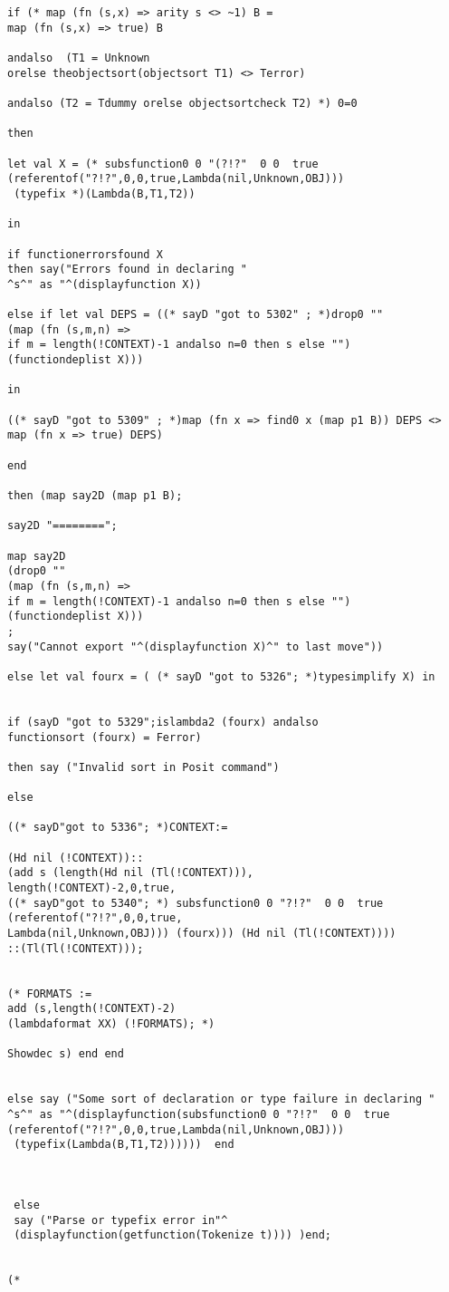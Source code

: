 \documentclass[12pt]{article}
\begin{document}
\begin{verbatim}
if (* map (fn (s,x) => arity s <> ~1) B = 
map (fn (s,x) => true) B

andalso  (T1 = Unknown 
orelse theobjectsort(objectsort T1) <> Terror)

andalso (T2 = Tdummy orelse objectsortcheck T2) *) 0=0

then 

let val X = (* subsfunction0 0 "(?!?"  0 0  true 
(referentof("?!?",0,0,true,Lambda(nil,Unknown,OBJ)))
 (typefix *)(Lambda(B,T1,T2))

in

if functionerrorsfound X 
then say("Errors found in declaring "
^s^" as "^(displayfunction X))

else if let val DEPS = ((* sayD "got to 5302" ; *)drop0 "" 
(map (fn (s,m,n) => 
if m = length(!CONTEXT)-1 andalso n=0 then s else "") 
(functiondeplist X)))

in

((* sayD "got to 5309" ; *)map (fn x => find0 x (map p1 B)) DEPS <>
map (fn x => true) DEPS)

end

then (map say2D (map p1 B);

say2D "========";

map say2D
(drop0 "" 
(map (fn (s,m,n) => 
if m = length(!CONTEXT)-1 andalso n=0 then s else "") 
(functiondeplist X)))
;
say("Cannot export "^(displayfunction X)^" to last move"))

else let val fourx = ( (* sayD "got to 5326"; *)typesimplify X) in


if (sayD "got to 5329";islambda2 (fourx) andalso 
functionsort (fourx) = Ferror)

then say ("Invalid sort in Posit command")

else

((* sayD"got to 5336"; *)CONTEXT:=

(Hd nil (!CONTEXT))::
(add s (length(Hd nil (Tl(!CONTEXT))),
length(!CONTEXT)-2,0,true,
((* sayD"got to 5340"; *) subsfunction0 0 "?!?"  0 0  true 
(referentof("?!?",0,0,true,
Lambda(nil,Unknown,OBJ))) (fourx))) (Hd nil (Tl(!CONTEXT))))
::(Tl(Tl(!CONTEXT)));


(* FORMATS := 
add (s,length(!CONTEXT)-2) 
(lambdaformat XX) (!FORMATS); *)

Showdec s) end end


else say ("Some sort of declaration or type failure in declaring "
^s^" as "^(displayfunction(subsfunction0 0 "?!?"  0 0  true 
(referentof("?!?",0,0,true,Lambda(nil,Unknown,OBJ)))
 (typefix(Lambda(B,T1,T2))))))  end 
 
 
 
 else 
 say ("Parse or typefix error in"^
 (displayfunction(getfunction(Tokenize t)))) )end;


(*

\end{verbatim}
\end{document}
